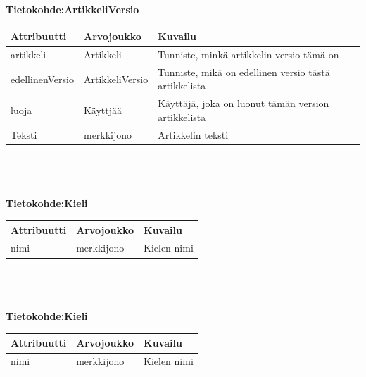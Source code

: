 \documentclass[12pt]{article}
\begin{document}
        \textbf{Tietokohde:ArtikkeliVersio} \\
        \begin{tabular}{|p{8em}|p{8em}|p{13em}|} \hline
            \textbf{Attribuutti} & \textbf{Arvojoukko} & \textbf{Kuvailu} \\ \hline
                    artikkeli
                &   Artikkeli
                &   Tunniste, minkä artikkelin versio tämä on
            \\ \hline
                    edellinenVersio
                &   ArtikkeliVersio
                &   Tunniste, mikä on edellinen versio tästä artikkelista
            \\ \hline
                    luoja
                &   Käyttjää
                &   Käyttäjä, joka on luonut tämän version artikkelista
            \\ \hline
                    Teksti
                &   merkkijono
                &   Artikkelin teksti
            \\ \hline
        \end{tabular} \\ \\ \\

        \textbf{Tietokohde:Kieli} \\
        \begin{tabular}{|p{8em}|p{8em}|p{13em}|} \hline
            \textbf{Attribuutti} & \textbf{Arvojoukko} & \textbf{Kuvailu} \\ \hline
                    nimi
                &   merkkijono
                &   Kielen nimi
            \\ \hline
        \end{tabular} \\ \\ \\

        \textbf{Tietokohde:Kieli} \\
        \begin{tabular}{|p{8em}|p{8em}|p{13em}|} \hline
            \textbf{Attribuutti} & \textbf{Arvojoukko} & \textbf{Kuvailu} \\ \hline
                    nimi
                &   merkkijono
                &   Kielen nimi
            \\ \hline
        \end{tabular} \\ \\ \\
\end{document}
